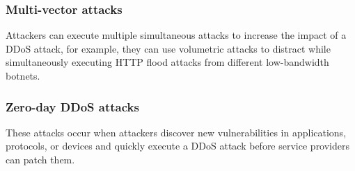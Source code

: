 \documentclass[a4paper, 12pt]{report} %
\begin{document}
            \subsubsection{Multi-vector attacks}
            Attackers can execute multiple simultaneous attacks to increase the impact of a DDoS attack, for example, they can use volumetric attacks to distract while simultaneously executing HTTP flood attacks from different low-bandwidth botnets.

            \subsubsection{Zero-day DDoS attacks}
            These attacks occur when attackers discover new vulnerabilities in applications, protocols, or devices and quickly execute a DDoS attack before service providers can patch them.
\end{document}
